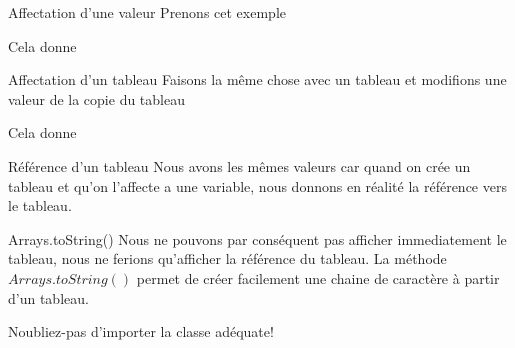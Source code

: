 \begin{frame}{Affectation d'une valeur}
    Prenons cet exemple
    
    Cela donne
    
\end{frame}

\begin{frame}{Affectation d'un tableau}
    Faisons la même chose avec un tableau et modifions une valeur de la copie du tableau
    
    Cela donne
    

\end{frame}

\begin{frame}{Référence d'un tableau}
    Nous avons les mêmes valeurs car quand on crée un tableau et qu'on l'affecte a une variable,
    nous donnons en réalité la référence vers le tableau.

    \begin{exampleblock}{Arrays.toString()}
        Nous ne pouvons par conséquent pas afficher immediatement le tableau,
        nous ne ferions qu'afficher la référence du tableau.
        La méthode $Arrays.toString()$ permet de créer facilement une chaine de caractère à partir d'un tableau.

        \tiny\center Noubliez-pas d'importer la classe adéquate!
        
    \end{exampleblock}
\end{frame}
